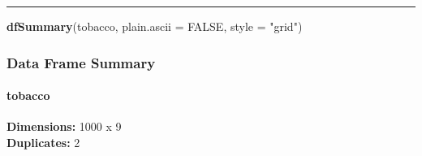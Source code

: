 \documentclass[]{article}
\newenvironment{Shaded}{\begin{snugshade}}{\end{snugshade}}
\newcommand{\DataTypeTok}[1]{\textcolor[rgb]{0.13,0.29,0.53}{#1}}
\newcommand{\KeywordTok}[1]{\textcolor[rgb]{0.13,0.29,0.53}{\textbf{#1}}}
\newcommand{\NormalTok}[1]{#1}
\newcommand{\OtherTok}[1]{\textcolor[rgb]{0.56,0.35,0.01}{#1}}
\newcommand{\StringTok}[1]{\textcolor[rgb]{0.31,0.60,0.02}{#1}}
\let\oldparagraph\paragraph
\renewcommand{\paragraph}[1]{\oldparagraph{#1}\mbox{}}
\begin{document}
\begin{center}\rule{0.5\linewidth}{\linethickness}\end{center}

\begin{Shaded}
\begin{Highlighting}[]
\KeywordTok{dfSummary}\NormalTok{(tobacco, }\DataTypeTok{plain.ascii =} \OtherTok{FALSE}\NormalTok{, }\DataTypeTok{style =} \StringTok{"grid"}\NormalTok{)}
\end{Highlighting}
\end{Shaded}

\hypertarget{data-frame-summary}{%
\subsubsection{Data Frame Summary}\label{data-frame-summary}}

\hypertarget{tobacco}{%
\paragraph{tobacco}\label{tobacco}}

\textbf{Dimensions:} 1000 x 9\\
\textbf{Duplicates:} 2
\end{document}
